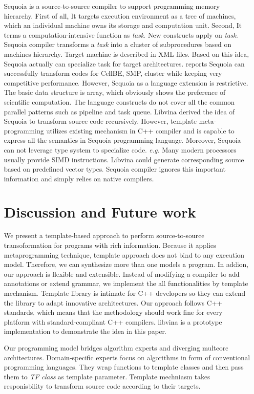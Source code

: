 \documentclass[10pt, conference, compsocconf]{IEEEtran}
\begin{document}
Sequoia \cite{b1} is a source-to-source compiler to support
programming memory hierarchy. First of all, It targets execution
environment as a tree of machines, which an individual machine owns
its storage and computation unit. Second, It terms a
computation-intensive function as \textit{task}. New constructs apply
on \emph{task}. Sequoia compiler transforms a \textit{task} into a
cluster of subprocedures based on machines hierarchy. Target machine
is described in XML files. Based on this idea, Sequoia actually can specialize task for target architectures. \cite{b2} reports Sequoia can successfully transform codes for CellBE, SMP, cluster while keeping very competitive performance. However, Sequoia as a language extension is restrictive. The basic data structure is array, which obviously shows the preference of scientific computation. The language constructs do not cover all the common parallel patterns such as pipeline and task queue. Libvina derived the idea of Sequoia to transform source code recursively. However, template meta-programming utilizes existing mechanism in C++ compiler and is capable to express all the semantics in Sequoia programming language. Moreover, Sequoia can not leverage type system to specialize code. \textit{e.g.} Many modern processors usually provide SIMD instructions. Libvina could generate corresponding source based on predefined vector types. Sequoia compiler ignores this important information and simply relies on native compilers.

\section{Discussion and Future work}
We present a template-based approach to perform source-to-source
transoformation for programs with rich information. Because it applies 
metaprogramming technique, template approach does not bind to any execution
model. Therefore, we can synthesize more than one models a program. In
addion, our approach
is flexible and extensible. Instead of modifying a compiler to add
annotations or extend grammar, we implement the all functionalities by template mechanism. Template library is
intimate for C++ developers so they can extend the library to adapt
innovative architectures.  Our approach follows C++ standards,
which means that the methodology should work fine for every platform with
standard-compliant C++ compilers.  libvina is a prototype
implementation to demonstrate the idea in this paper.

Our programming model bridges algorithm experts and diverging multcore
architectures. Domain-specific experts focus on algorithms in form of
conventional programming languages. They wrap functions to template
classes and then pass them to \emph{TF class} as template parameter. Template
mechniasm takes responisbility to transform source code according to
their targets.
\end{document}

